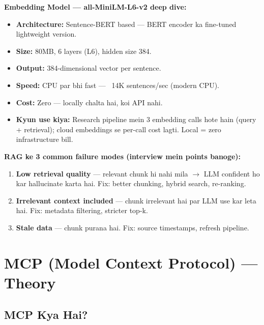 \documentclass[11pt, a4paper]{article}
\begin{document}
\begin{conceptbox}
\textbf{Embedding Model --- all-MiniLM-L6-v2 deep dive:}

\begin{itemize}
\item \textbf{Architecture:} Sentence-BERT based --- BERT encoder ka fine-tuned lightweight version.
\item \textbf{Size:} 80MB, 6 layers (L6), hidden size 384.
\item \textbf{Output:} 384-dimensional vector per sentence.
\item \textbf{Speed:} CPU par bhi fast --- ~14K sentences/sec (modern CPU).
\item \textbf{Cost:} Zero --- locally chalta hai, koi API nahi.
\item \textbf{Kyun use kiya:} Research pipeline mein 3 embedding calls hote hain (query + retrieval); cloud embeddings se per-call cost lagti. Local = zero infrastructure bill.
\end{itemize}
\end{conceptbox}

\begin{warningbox}
\textbf{RAG ke 3 common failure modes (interview mein points banoge):}
\begin{enumerate}
\item \textbf{Low retrieval quality} --- relevant chunk hi nahi mila $\rightarrow$ LLM confident ho kar hallucinate karta hai. Fix: better chunking, hybrid search, re-ranking.
\item \textbf{Irrelevant context included} --- chunk irrelevant hai par LLM use kar leta hai. Fix: metadata filtering, stricter top-k.
\item \textbf{Stale data} --- chunk purana hai. Fix: source timestamps, refresh pipeline.
\end{enumerate}
\end{warningbox}

\section{MCP (Model Context Protocol) --- Theory}

\subsection{MCP Kya Hai?}
\end{document}
